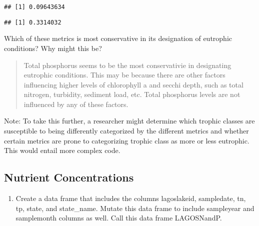 \documentclass[]{article}
\newenvironment{Shaded}{\begin{snugshade}}{\end{snugshade}}
\newcommand{\CommentTok}[1]{\textcolor[rgb]{0.56,0.35,0.01}{\textit{#1}}}
\newcommand{\DecValTok}[1]{\textcolor[rgb]{0.00,0.00,0.81}{#1}}
\newcommand{\OperatorTok}[1]{\textcolor[rgb]{0.81,0.36,0.00}{\textbf{#1}}}
\providecommand{\tightlist}{%
  \setlength{\itemsep}{0pt}\setlength{\parskip}{0pt}}
\begin{document}
\begin{verbatim}
## [1] 0.09643634
\end{verbatim}

\begin{Shaded}
\end{Shaded}

\begin{verbatim}
## [1] 0.3314032
\end{verbatim}

\begin{Shaded}
\end{Shaded}

Which of these metrics is most conservative in its designation of
eutrophic conditions? Why might this be?

\begin{quote}
Total phosphorus seems to be the most conservativie in designating
eutrophic conditions. This may be because there are other factors
influencing higher levels of chlorophyll a and secchi depth, such as
total nitrogen, turbidity, sediment load, etc. Total phosphorus levels
are not influenced by any of these factors.
\end{quote}

Note: To take this further, a researcher might determine which trophic
classes are susceptible to being differently categorized by the
different metrics and whether certain metrics are prone to categorizing
trophic class as more or less eutrophic. This would entail more complex
code.

\hypertarget{nutrient-concentrations}{%
\subsection{Nutrient Concentrations}\label{nutrient-concentrations}}

\begin{enumerate}
\def\labelenumi{\arabic{enumi}.}
\setcounter{enumi}{7}
\tightlist
\item
  Create a data frame that includes the columns lagoslakeid, sampledate,
  tn, tp, state, and state\_name. Mutate this data frame to include
  sampleyear and samplemonth columns as well. Call this data frame
  LAGOSNandP.
\end{enumerate}
\end{document}
